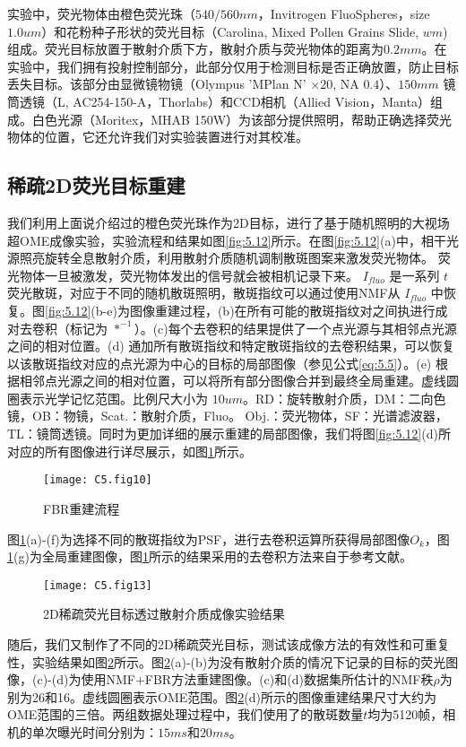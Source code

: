 实验中，荧光物体由橙色荧光珠（$540/560 nm$，Invitrogen FluoSpheres，size $1.0 um$）和花粉种子形状的荧光目标（Carolina, Mixed Pollen Grains Slide, $wm$)组成。荧光目标放置于散射介质下方，散射介质与荧光物体的距离为$0.2 mm$。在实验中，我们拥有投射控制部分，此部分仅用于检测目标是否正确放置，防止目标丢失目标。该部分由显微镜物镜（Olympus 'MPlan N' $\times 20$, NA $0.4$）、$ 150 mm$ 镜筒透镜（L, AC254-150-A，Thorlabs）和CCD相机（Allied Vision，Manta）组成。白色光源（Moritex，MHAB 150W）为该部分提供照明，帮助正确选择荧光物体的位置，它还允许我们对实验装置进行对其校准。
\subsection{稀疏2D荧光目标重建}
我们利用上面说介绍过的橙色荧光珠作为2D目标，进行了基于随机照明的大视场超OME成像实验，实验流程和结果如图\ref{fig:5.12}所示。在图\ref{fig:5.12}(a)中，相干光源照亮旋转全息散射介质，利用散射介质随机调制散斑图案来激发荧光物体。 荧光物体一旦被激发，荧光物体发出的信号就会被相机记录下来。 $I_{fluo}$ 是一系列 $t$ 荧光散斑，对应于不同的随机散斑照明，散斑指纹可以通过使用NMF从 $I_{fluo}$ 中恢复。图\ref{fig:5.12}(b-e)为图像重建过程，(b)在所有可能的散斑指纹对之间执进行成对去卷积（标记为 $*^{-1}$）。(c)每个去卷积的结果提供了一个点光源与其相邻点光源之间的相对位置。(d) 通加所有散斑指纹和特定散斑指纹的去卷积结果，可以恢复以该散斑指纹对应的点光源为中心的目标的局部图像（参见公式\ref{eq:5.5}）。(e) 根据相邻点光源之间的相对位置，可以将所有部分图像合并到最终全局重建。虚线圆圈表示光学记忆范围。比例尺大小为 $10 um$。RD：旋转散射介质，DM：二向色镜，OB：物镜，Scat.：散射介质，Fluo。 Obj.：荧光物体，SF：光谱滤波器，TL：镜筒透镜。同时为更加详细的展示重建的局部图像，我们将图\ref{fig:5.12}(d)所对应的所有图像进行详尽展示，如图\ref{fig:5.10}所示。

\begin{figure}[htp]
	\centering
	\texttt{[image: C5.fig10]}
	\caption{FBR重建流程}
	\label{fig:5.10}
\end{figure}

图\ref{fig:5.10}(a)-(f)为选择不同的散斑指纹为PSF，进行去卷积运算所获得局部图像$O_{k}$，图\ref{fig:5.10}(g)为全局重建图像，图\ref{fig:5.10}所示的结果采用的去卷积方法来自于参考文献\cite{Chan2011}。

\begin{figure}[htp]
	\centering
	\texttt{[image: C5.fig13]}
	\caption{2D稀疏荧光目标透过散射介质成像实验结果}
	\label{fig:5.13}
\end{figure}

随后，我们又制作了不同的2D稀疏荧光目标，测试该成像方法的有效性和可重复性，实验结果如图\ref{fig:5.13}所示。图\ref{fig:5.13}(a)-(b)为没有散射介质的情况下记录的目标的荧光图像，(c)-(d)为使用NMF+FBR方法重建图像。(c)和(d)数据集所估计的NMF秩$\rho$为别为26和16。虚线圆圈表示OME范围。图\ref{fig:5.13}(d)所示的图像重建结果尺寸大约为OME范围的三倍。两组数据处理过程中，我们使用了的散斑数量$t$均为5120帧，相机的单次曝光时间分别为：$15ms$和$20 ms$。


